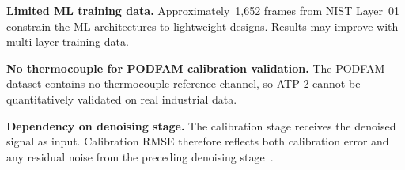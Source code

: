 \textbf{Limited ML training data.} Approximately~1,652 frames from NIST Layer~01 constrain the ML architectures to lightweight designs. Results may improve with multi-layer training data.

\textbf{No thermocouple for PODFAM calibration validation.} The PODFAM dataset contains no thermocouple reference channel, so ATP-2 cannot be quantitatively validated on real industrial data.

\textbf{Dependency on denoising stage.} The calibration stage receives the denoised signal as input. Calibration RMSE therefore reflects both calibration error and any residual noise from the preceding denoising stage~\cite{sravya2026}.

\let\cleardoublepage\clearpage
